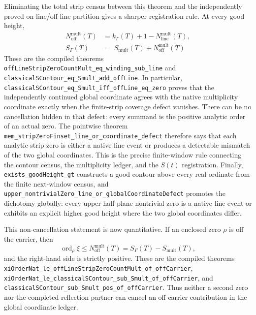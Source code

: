 \documentclass[11pt]{article}
\theoremstyle{definition}
\begin{document}
Eliminating the total strip census between this theorem and the independently
proved on-line/off-line partition gives a sharper registration rule.  At every
good height,
\begin{align}
 N_{\mathrm{off}}^{\mathrm{mult}}(T)
   &=k_\Gamma(T)+1-N_{\mathrm{line}}^{\mathrm{mult}}(T),
   \label{eq:off-line-winding-defect}\\
 S_\Gamma(T)
   &=\boxed{\;S_{\mathrm{mult}}(T)+N_{\mathrm{off}}^{\mathrm{mult}}(T)\;}
   \label{eq:global-coordinate-defect}
\end{align}
These are the compiled theorems
\texttt{offLineStripZeroCountMult\_eq\_winding\_sub\_line} and
\texttt{classicalSContour\_eq\_Smult\_add\_offLine}.  In particular,
\texttt{classicalSContour\_eq\_Smult\_iff\_offLine\_eq\_zero} proves that
the independently continued global coordinate agrees with the native
multiplicity coordinate exactly when the finite-strip coverage defect
vanishes.  There can be no cancellation hidden in that defect: every summand
is the positive analytic order of an actual zero.  The pointwise theorem
\texttt{mem\_stripZeroFinset\_line\_or\_coordinate\_defect} therefore says
that each analytic strip zero is either a native line event or produces a
detectable mismatch of the two global coordinates.  This is the precise
finite-window rule connecting the contour census, the multiplicity ledger,
and the \(S(t)\) registration.  Finally,
\texttt{exists\_goodHeight\_gt} constructs a good contour above every real
ordinate from the finite next-window census, and
\texttt{upper\_nontrivialZero\_line\_or\_globalCoordinateDefect} promotes the
dichotomy globally: every upper-half-plane nontrivial zero is a native line
event or exhibits an explicit higher good height where the two global
coordinates differ.

This non-cancellation statement is now quantitative.  If an enclosed zero
\(\rho\) is off the carrier, then
\[
  \operatorname{ord}_{\rho}\xi
   \le N_{\mathrm{off}}^{\mathrm{mult}}(T)
   =S_\Gamma(T)-S_{\mathrm{mult}}(T),
\]
and the right-hand side is strictly positive.  These are the compiled
theorems
\texttt{xiOrderNat\_le\_offLineStripZeroCountMult\_of\_offCarrier},
\texttt{xiOrderNat\_le\_classicalSContour\_sub\_Smult\_of\_offCarrier}, and
\texttt{classicalSContour\_sub\_Smult\_pos\_of\_offCarrier}.  Thus neither a
second zero nor the completed-reflection partner can cancel an off-carrier
contribution in the global coordinate ledger.
\end{document}
